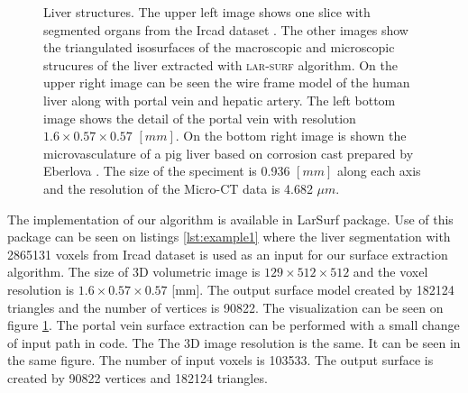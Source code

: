\begin{figure}
\caption{
Liver structures. The upper left image shows one slice  with segmented organs from  the Ircad dataset \cite{ircad}.
The other images show the triangulated isosurfaces of the macroscopic and microscopic strucures of the liver extracted with \textsc{lar-surf} algorithm. 
On the upper right image can be seen the wire frame model of the human liver along with portal vein and hepatic artery. 
The left bottom image shows the detail of the portal vein  
with resolution $1.6\times0.57\times0.57$ $[mm]$.
On the bottom right image is shown the microvasculature of a pig liver based on corrosion cast prepared by Eberlova
\cite{eberlova2017use}. The size of the speciment is 0.936 $[mm]$ along each axis and the resolution of the Micro-CT data is 4.682 $\mu{}m$.
} \label{fig:example_liver_macro_micro}
\end{figure}


The implementation of our algorithm is available in LarSurf package. 
Use of this package can be seen on listings \ref{lst:example1} where the liver segmentation with 2865131 voxels from
Ircad dataset is used as an input for our surface extraction algorithm. The size of 3D volumetric 
image is $129 \times 512 \times 512$
and the voxel resolution is $1.6\times0.57\times0.57$ [mm]. 
The output surface model created by  182124 triangles and the number of vertices is 90822. The visualization can 
be seen on figure \ref{fig:example_liver_macro_micro}. 
The portal vein surface extraction can be performed with a small change of input path in code.
The The 3D image resolution is the same. 
It can be seen in the same figure. 
The number of input voxels is 103533. 
The output surface is created by 90822 vertices and 182124 triangles. 

